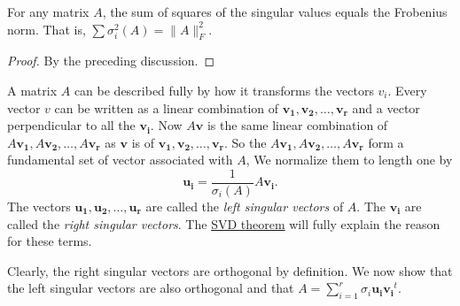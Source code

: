 \begin{lemma}\label{lm: frobenius norm}
  For any matrix \(A\), the sum of squares of the singular values equals the Frobenius norm. That is, \(\sum \sigma _i^2(A)= \lVert A \rVert _F^2 \).  
\end{lemma}

\begin{proof}
  By the preceding discussion.
\end{proof}

A matrix \(A\) can be described fully by how it transforms the vectors \(v_i\). Every vector \(v\) can be written as a linear combination of \(\mathbf{v_1} , \mathbf{v_2} , \dots , \mathbf{v_r} \) and a vector perpendicular to all the \(\mathbf{v_i} \). Now \(A \mathbf{v} \) is the same linear combination of \(A \mathbf{v_1}, A \mathbf{v_2}, \dots  ,A \mathbf{v_r}   \) as \(\mathbf{v} \) is of \(\mathbf{v_1}, \mathbf{v_2}, \dots , \mathbf{v_r} \). So the \(A \mathbf{v_1}, A \mathbf{v_2}, \dots  ,A \mathbf{v_r}   \)  form a fundamental set of vector associated with \(A\), We normalize them to length one by 
\[
  \mathbf{u_i}= \frac{1}{\sigma _i (A)}A \mathbf{v_i}.  
\]     
The vectors \(\mathbf{u_1}, \mathbf{u_2}, \dots , \mathbf{u_r}   \) are called the \textit{left singular vectors} of \(A\). The \(\mathbf{v_i} \) are called the \textit{right singular vectors}. The \hyperref[thm: SVD theorem]{SVD theorem} will fully explain the reason for these terms.   

Clearly, the right singular vectors are orthogonal by definition. We now show that the left singular vectors are also orthogonal and that \(A=\sum_{i=1}^r \sigma _i \mathbf{u_i} \mathbf{v_i}^t  \). 

